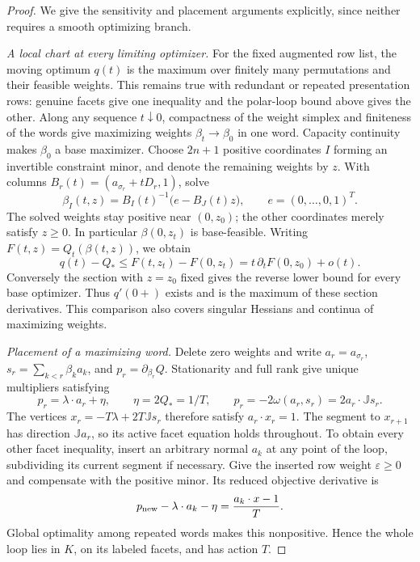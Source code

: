 \begin{proof}
We give the sensitivity and placement arguments explicitly, since neither
requires a smooth optimizing branch.

\emph{A local chart at every limiting optimizer.}
For the fixed augmented row list, the moving optimum $q(t)$ is the maximum
over finitely many permutations and their feasible weights. This remains
true with redundant or repeated presentation rows: genuine facets give one
inequality and the polar-loop bound above gives the other. Along any sequence
$t\downarrow0$, compactness of the weight simplex and finiteness of the words
give maximizing weights $\beta_t\to\beta_0$ in one word. Capacity continuity
makes $\beta_0$ a base maximizer.
Choose $2n+1$ positive coordinates $I$ forming an invertible constraint minor,
and denote the remaining weights by $z$. With columns
$B_r(t)=(a_{\sigma_r}+tD_r,1)$, solve
\[
 \beta_I(t,z)=B_I(t)^{-1}\bigl(e-B_J(t)z\bigr),
 \qquad e=(0,\ldots,0,1)^T.
\]
The solved weights stay positive near $(0,z_0)$; the other coordinates merely
satisfy $z\geq0$. In particular $\beta(0,z_t)$ is base-feasible.
Writing $F(t,z)=Q_t(\beta(t,z))$, we obtain
\[
 q(t)-Q_*\leq F(t,z_t)-F(0,z_t)
             =t\,\partial_tF(0,z_0)+o(t).
\]
Conversely the section with $z=z_0$ fixed gives the reverse lower bound for
every base optimizer. Thus $q'(0+)$ exists and is the maximum of these
section derivatives. This comparison also covers singular Hessians and
continua of maximizing weights.

\emph{Placement of a maximizing word.}
Delete zero weights and write $a_r=a_{\sigma_r}$,
$s_r=\sum_{k<r}\beta_ka_k$, and $p_r=\partial_{\beta_r}Q$.
Stationarity and full rank give unique multipliers satisfying
\[
 p_r=\lambda\cdot a_r+\eta,
 \qquad \eta=2Q_*=1/T,
 \qquad p_r=-2\omega(a_r,s_r)=2a_r\cdot \mathbb{J}s_r.
\]
The vertices $x_r=-T\lambda+2T\mathbb{J}s_r$ therefore satisfy $a_r\cdot x_r=1$.
The segment to $x_{r+1}$ has direction $\mathbb{J}a_r$, so its active facet equation
holds throughout. To obtain every other facet inequality, insert an arbitrary
normal $a_k$ at any point of the loop, subdividing its current segment if
necessary. Give the inserted row weight $\varepsilon\geq0$ and compensate
with the positive minor. Its reduced objective derivative is
\[
 p_{\rm new}-\lambda\cdot a_k-\eta
   =\frac{a_k\cdot x-1}{T}.
\]
Global optimality among repeated words makes this nonpositive. Hence the
whole loop lies in $K$, on its labeled facets, and has action $T$.


\end{proof}
